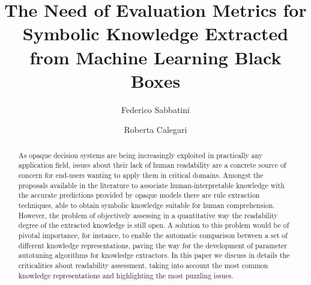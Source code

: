 \documentclass[sigconf]{acmart}
\begin{document}
\title{The Need of Evaluation Metrics for Symbolic Knowledge Extracted from Machine Learning Black Boxes}

\author{Federico Sabbatini}

\author{Roberta Calegari}

\renewcommand{\shortauthors}{F. Sabbatini, R. Calegari}

\begin{abstract}
  As opaque decision systems are being increasingly exploited in practically any application field, issues about their lack of human readability are a concrete source of concern for end-users wanting to apply them in critical domains.
  Amongst the proposals available in the literature to associate human-interpretable knowledge with the accurate predictions provided by opaque models there are rule extraction techniques, able to obtain symbolic knowledge suitable for human comprehension.
  However, the problem of objectively assessing in a quantitative way the readability degree of the extracted knowledge is still open.
  A solution to this problem would be of pivotal importance, for instance, to enable the automatic comparison between a set of different knowledge representations, paving the way for the development of parameter autotuning algorithms for knowledge extractors.
  In this paper we discuss in details the criticalities about readability assessment, taking into account the most common knowledge representations and highlighting the most puzzling issues.
\end{abstract}
\end{document}
